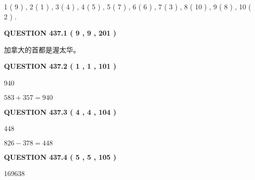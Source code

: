 \documentclass{ctexart}
\begin{document}
   
   1 ( 9 )
 ,
   2 ( 1 )
 ,
   3 ( 4 )
 ,
   4 ( 5 )
 ,
   5 ( 7 )
 ,
   6 ( 6 )
 ,
   7 ( 3 )
 ,
   8 ( 10 )
 ,
   9 ( 8 )
 ,
   10 ( 2 )
 .
  
\vspace{0.2in}
  
{\textbf{\Large{QUESTION
437.1 
 ( 9 , 9 , 201 )
}}}
  
  
 
 
\noindent{}
 
 
加拿大的首都是渥太华。
 
 
 
 
  
\vspace{0.2in}
  
{\textbf{\Large{QUESTION
437.2 
 ( 1 , 1 , 101 )
}}}
  
  
 
 
\noindent{}

940
 
 
 
 
\noindent{}

$ %
583 +  %
357=   %
940$
 
 
  
\vspace{0.2in}
  
{\textbf{\Large{QUESTION
437.3 
 ( 4 , 4 , 104 )
}}}
  
  
 
 
\noindent{}

448
 
 
 
 
\noindent{}

$ %
826 -  %
378=   %
448$
 
 
  
\vspace{0.2in}
  
{\textbf{\Large{QUESTION
437.4 
 ( 5 , 5 , 105 )
}}}
  
  
 
 
\noindent{}

169638
 
\end{document}
